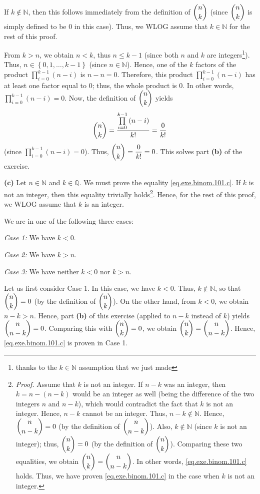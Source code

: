\documentclass[paper=a4, fontsize=12pt]{scrartcl} %
\newcommand{\QQ}{\mathbb{Q}} %
\newcommand{\NN}{\mathbb{N}} %
\newcommand{\set}[1]{\left\{ #1 \right\}}
\newcommand{\tup}[1]{\left( #1 \right)}
\let\prodnonlimits\prod
\renewcommand{\prod}{\prodnonlimits\limits}
\theoremstyle{plainsl}
\theoremstyle{definition}
\theoremstyle{remark}
\begin{document}
If $k \notin \NN$, then this follows immediately from the
definition of $\dbinom{n}{k}$ (since $\dbinom{n}{k}$ is
simply defined to be $0$ in this case).
Thus, we WLOG assume that $k \in \NN$ for the rest of this
proof.

From $k > n$, we obtain $n < k$, thus $n \leq k-1$
(since both $n$ and $k$ are integers\footnote{thanks to
the $k \in \NN$ assumption that we just made}).
Thus, $n \in \set{0, 1, \ldots, k-1}$ (since $n \in \NN$).
Hence, one of the $k$ factors of the product
$\prod_{i=0}^{k-1} \tup{n-i}$ is $n-n = 0$.
Therefore, this product $\prod_{i=0}^{k-1} \tup{n-i}$
has at least one factor equal to $0$; thus, the whole
product is $0$.
In other words, $\prod_{i=0}^{k-1} \tup{n-i} = 0$.
Now, the definition of $\dbinom{n}{k}$ yields
\[
\dbinom{n}{k}
= \dfrac{ \prod_{i=0}^{k-1} \tup{n-i} }{k!}
= \dfrac{0}{k!}
\]
(since $\prod_{i=0}^{k-1} \tup{n-i} = 0$).
Thus, $\dbinom{n}{k} = \dfrac{0}{k!} = 0$.
This solves part \textbf{(b)} of the exercise.

\vspace{0.8pc}

\textbf{(c)}
Let $n \in \NN$ and $k \in \QQ$.
We must prove the equality \eqref{eq.exe.binom.101.c}.
If $k$ is not an integer, then this equality trivially
holds\footnote{\textit{Proof.} Assume that $k$ is not
an integer. If $n-k$ was an integer, then
$k = n - \tup{n-k}$ would be an integer as well (being
the difference of the two integers $n$ and $n-k$),
which would contradict the fact that $k$ is not an
integer.
Hence, $n-k$ cannot be an integer.
Thus, $n-k \notin \NN$.
Hence, $\dbinom{n}{n-k} = 0$ (by the definition of
$\dbinom{n}{n-k}$).
Also, $k \notin \NN$ (since $k$ is not an integer); thus,
$\dbinom{n}{k} = 0$ (by the definition of $\dbinom{n}{k}$).
Comparing these two equalities, we obtain
$\dbinom{n}{k} = \dbinom{n}{n-k}$.
In other words, \eqref{eq.exe.binom.101.c} holds.
Thus, we have proven \eqref{eq.exe.binom.101.c} in the case
when $k$ is not an integer.}.
Hence, for the rest of this proof, we WLOG assume that $k$
is an integer.

We are in one of the following three cases:

\textit{Case 1:} We have $k < 0$.

\textit{Case 2:} We have $k > n$.

\textit{Case 3:} We have neither $k < 0$ nor $k > n$.

Let us first consider Case 1.
In this case, we have $k < 0$.
Thus, $k \notin \NN$, so that $\dbinom{n}{k} = 0$
(by the definition of $\dbinom{n}{k}$).
On the other hand, from $k < 0$, we obtain $n-k > n$.
Hence, part \textbf{(b)} of this exercise (applied to $n-k$
instead of $k$) yields $\dbinom{n}{n-k} = 0$.
Comparing this with $\dbinom{n}{k} = 0$, we obtain
$\dbinom{n}{k} = \dbinom{n}{n-k}$.
Hence, \eqref{eq.exe.binom.101.c} is proven in Case 1.
\end{document}
